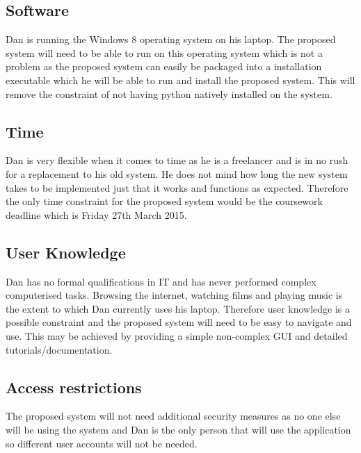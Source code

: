\subsection{Software}

\begin{flushleft}
	Dan is running the Windows 8 operating system on his laptop. The proposed system will need to be able to run on this operating system which is not a problem as the proposed system can easily be packaged into a installation executable which he will be able to run and install the proposed system. This will remove the constraint of not having python natively installed on the system.

\end{flushleft}

\subsection{Time}

\begin{flushleft}
 	Dan is very flexible when it comes to time as he is a freelancer and is in no rush for a replacement to his old system. He does not mind how long the new system takes to be implemented just that it works and functions as expected. Therefore the only time constraint for the proposed system would be the coursework deadline which is Friday 27th March 2015.
\end{flushleft}

\subsection{User Knowledge}

\begin{flushleft}
	Dan has no formal qualifications in IT and has never performed complex computerised tasks. Browsing the internet, watching films and playing music is the extent to which Dan currently uses his laptop. Therefore user knowledge is a possible constraint and the proposed system will need to be easy to navigate and use. This may be achieved by providing a simple non-complex GUI and detailed tutorials/documentation.
\end{flushleft}

\subsection{Access restrictions}

\begin{flushleft}

	The proposed system will not need additional security measures as no one else will be using the system and Dan is the only person that will use the application so different user accounts will not be needed. 

\end{flushleft}

